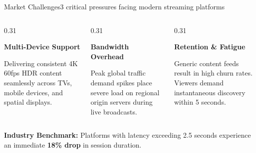 \documentclass[aspectratio=169,11pt]{beamer}
\begin{document}
\begin{frame}{Market Challenges}{3 critical pressures facing modern streaming platforms}
  \vspace{2pt}
  \begin{columns}[T]
    \begin{column}{0.31\textwidth}
      \begin{tcolorbox}[keynotecard]
        {\Large\color{accentblue}\faMobile} \par
        \vspace{4pt}
        {\bfseries\color{textdark} Multi-Device Support} \par
        \vspace{2pt}
        {\tiny\color{textmuted} Delivering consistent 4K 60fps HDR content seamlessly across TVs, mobile devices, and spatial displays.}
      \end{tcolorbox}
    \end{column}
    
    \begin{column}{0.31\textwidth}
      \begin{tcolorbox}[keynotecard]
        {\Large\color{accentblue}\faExclamationTriangle} \par
        \vspace{4pt}
        {\bfseries\color{textdark} Bandwidth Overhead} \par
        \vspace{2pt}
        {\tiny\color{textmuted} Peak global traffic demand spikes place severe load on regional origin servers during live broadcasts.}
      \end{tcolorbox}
    \end{column}
    
    \begin{column}{0.31\textwidth}
      \begin{tcolorbox}[keynotecard]
        {\Large\color{accentblue}\faUserClock} \par
        \vspace{4pt}
        {\bfseries\color{textdark} Retention \& Fatigue} \par
        \vspace{2pt}
        {\tiny\color{textmuted} Generic content feeds result in high churn rates. Viewers demand instantaneous discovery within 5 seconds.}
      \end{tcolorbox}
    \end{column}
  \end{columns}

  \vspace{6pt}
  \begin{tcolorbox}[accentcard]
    \small\color{textdark}\textbf{Industry Benchmark:} Platforms with latency exceeding 2.5 seconds experience an immediate \textbf{18\% drop} in session duration.
  \end{tcolorbox}
\end{frame}
\end{document}
